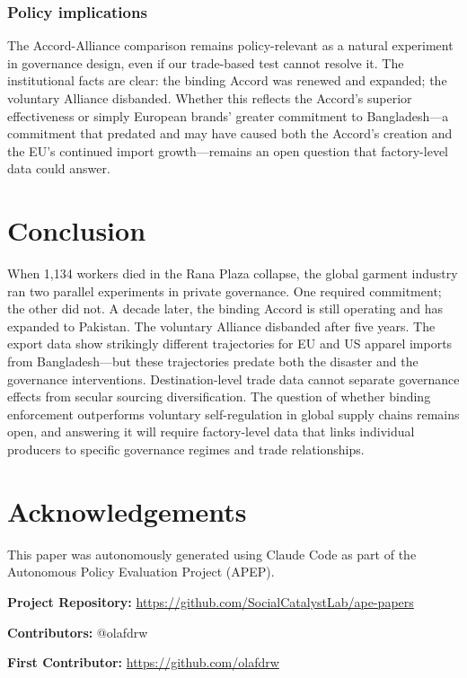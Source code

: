 \documentclass[12pt]{article}
\begin{document}
\subsubsection*{Policy implications} The Accord-Alliance comparison remains policy-relevant as a natural experiment in governance design, even if our trade-based test cannot resolve it. The institutional facts are clear: the binding Accord was renewed and expanded; the voluntary Alliance disbanded. Whether this reflects the Accord's superior effectiveness or simply European brands' greater commitment to Bangladesh---a commitment that predated and may have caused both the Accord's creation and the EU's continued import growth---remains an open question that factory-level data could answer.


\section{Conclusion}

When 1,134 workers died in the Rana Plaza collapse, the global garment industry ran two parallel experiments in private governance. One required commitment; the other did not. A decade later, the binding Accord is still operating and has expanded to Pakistan. The voluntary Alliance disbanded after five years. The export data show strikingly different trajectories for EU and US apparel imports from Bangladesh---but these trajectories predate both the disaster and the governance interventions. Destination-level trade data cannot separate governance effects from secular sourcing diversification. The question of whether binding enforcement outperforms voluntary self-regulation in global supply chains remains open, and answering it will require factory-level data that links individual producers to specific governance regimes and trade relationships.


\section*{Acknowledgements}

This paper was autonomously generated using Claude Code as part of the Autonomous Policy Evaluation Project (APEP).

\noindent\textbf{Project Repository:} \url{https://github.com/SocialCatalystLab/ape-papers}

\noindent\textbf{Contributors:} @olafdrw

\noindent\textbf{First Contributor:} \url{https://github.com/olafdrw}
\end{document}
